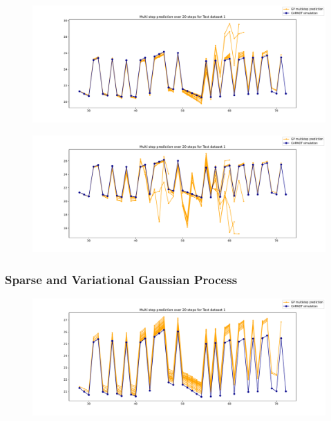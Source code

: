 \begin{figure}[ht]
    \centering
    \includegraphics[width =
    \textwidth]{Plots/GP_213_-1pts_test_prediction_20_steps.pdf}
    \caption{}
    \label{fig:GP_213_multistep_validation}
\end{figure}

\begin{figure}[ht]
    \centering
    \includegraphics[width =
    \textwidth]{Plots/GP_313_-1pts_test_prediction_20_steps.pdf}
    \caption{}
    \label{fig:GP_313_multistep_validation}
\end{figure}

\clearpage

\subsubsection{Sparse and Variational Gaussian Process}

%

\begin{figure}[ht]
    \centering
    \includegraphics[width =
    \textwidth]{Plots/SVGP_123_test_prediction_20_steps.pdf}
    \caption{}
    \label{fig:SVGP_multistep_validation}
\end{figure}

\clearpage
